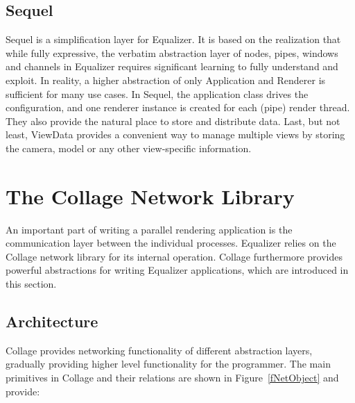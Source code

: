 \documentclass[10pt,journal,compsoc]{IEEEtran}
\newcommand{\fig}[1]{Figure~\ref{#1}}
\begin{document}
\subsection{\textsf{Sequel}}\label{sec:sequel}

\textsf{Sequel} is a simplification layer for \textsf{Equalizer}. It is based on
the realization that while fully expressive, the verbatim abstraction layer of
nodes, pipes, windows and channels in \textsf{Equalizer} requires significant
learning to fully understand and exploit. In reality, a higher abstraction of
only \textsf{Application} and \textsf{Renderer} is sufficient for many use
cases. In \textsf{Sequel}, the application class drives the configuration, and
one renderer instance is created for each (pipe) render thread. They also
provide the natural place to store and distribute data. Last, but not least,
\textsf{ViewData} provides a convenient way to manage multiple views by storing
the camera, model or any other view-specific information.


\section{The \textsf{Collage} Network Library}

An important part of writing a parallel rendering application is the
communication layer between the individual processes. \textsf{Equalizer} relies
on the
\textsf{Collage} network library for its internal operation. \textsf{Collage}
furthermore provides
powerful abstractions for writing \textsf{Equalizer} applications, which are
introduced
in this section.

\subsection{Architecture}

\textsf{Collage} provides networking functionality of different abstraction
layers, gradually providing higher level functionality for the programmer. The
main primitives in \textsf{Collage} and their relations are shown in
\fig{fNetObject} and provide:
\end{document}
